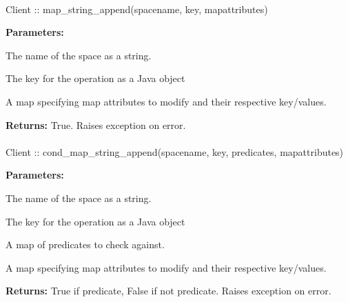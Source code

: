 \paragraph{}
\label{api:java:map_string_append}
\begin{javacode}
Client :: map_string_append(spacename, key, mapattributes)
\end{javacode}


\noindent\textbf{Parameters:}
\begin{description}[labelindent=\widthof{{\code{mapattributes}}},leftmargin=*,noitemsep,nolistsep,align=right]
\item[\code{spacename}] The name of the space as a string.
\item[\code{key}] The key for the operation as a Java object
\item[\code{mapattributes}] A map specifying map attributes to modify and their respective key/values.
\end{description}

\noindent\textbf{Returns:}
True.  Raises exception on error.

\paragraph{}
\label{api:java:cond_map_string_append}
\begin{javacode}
Client :: cond_map_string_append(spacename, key, predicates, mapattributes)
\end{javacode}


\noindent\textbf{Parameters:}
\begin{description}[labelindent=\widthof{{\code{mapattributes}}},leftmargin=*,noitemsep,nolistsep,align=right]
\item[\code{spacename}] The name of the space as a string.
\item[\code{key}] The key for the operation as a Java object
\item[\code{predicates}] A map of predicates to check against.
\item[\code{mapattributes}] A map specifying map attributes to modify and their respective key/values.
\end{description}

\noindent\textbf{Returns:}
True if predicate, False if not predicate.  Raises exception on error.

